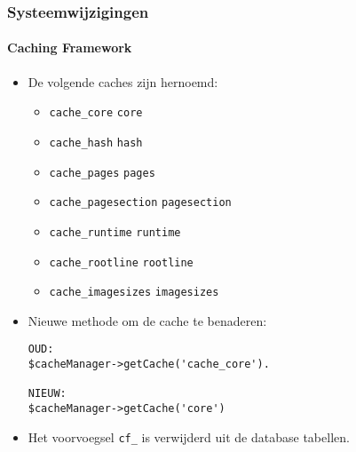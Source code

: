 \begin{frame}[fragile]
	\frametitle{Systeemwijzigingen}
	\framesubtitle{Caching Framework}

	\lstset{basicstyle=\tiny\ttfamily}

	\begin{itemize}
		\item De volgende caches zijn hernoemd:

			\begin{itemize}\smaller
				\item \texttt{cache\_core} \textrightarrow\hspace{0.1cm}\texttt{core}
				\item \texttt{cache\_hash} \textrightarrow\hspace{0.1cm}\texttt{hash}
				\item \texttt{cache\_pages} \textrightarrow\hspace{0.1cm}\texttt{pages}
				\item \texttt{cache\_pagesection} \textrightarrow\hspace{0.1cm}\texttt{pagesection}
				\item \texttt{cache\_runtime} \textrightarrow\hspace{0.1cm}\texttt{runtime}
				\item \texttt{cache\_rootline} \textrightarrow\hspace{0.1cm}\texttt{rootline}
				\item \texttt{cache\_imagesizes} \textrightarrow\hspace{0.1cm}\texttt{imagesizes}
			\end{itemize}\normalsize

		\item Nieuwe methode om de cache te benaderen:
\begin{lstlisting}
OUD:
$cacheManager->getCache('cache_core').

NIEUW:
$cacheManager->getCache('core')
\end{lstlisting}

		\item Het voorvoegsel \texttt{cf\_} is verwijderd uit de database tabellen.
	\end{itemize}

\end{frame}


